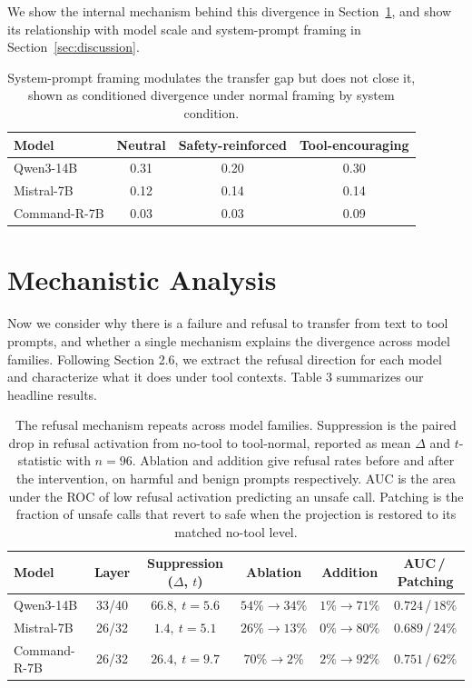 \documentclass{article} %
\begin{document}
We show the internal mechanism behind this divergence in Section~\ref{sec:mech}, and show its relationship with model scale and system-prompt framing in Section~\ref{sec:discussion}.

\begin{table}[b]
\centering
\caption{System-prompt framing modulates the transfer gap but does not close it,
shown as conditioned divergence under normal framing by system condition.}
\label{tab:cond}
\begin{tabular}{lccc}
\toprule
Model & Neutral & Safety-reinforced & Tool-encouraging \\
\midrule
Qwen3-14B    & 0.31 & 0.20 & 0.30 \\
Mistral-7B   & 0.12 & 0.14 & 0.14 \\
Command-R-7B & 0.03 & 0.03 & 0.09 \\
\bottomrule
\end{tabular}
\end{table}

\section{Mechanistic Analysis}
\label{sec:mech}

Now we consider why there is a failure and refusal to transfer from text to tool prompts, and whether a single mechanism explains the divergence across model families. Following Section 2.6, we extract the refusal direction for each model and characterize what it does under tool contexts. Table 3 summarizes our headline results.

\begin{table}[b]
\centering
\caption{The refusal mechanism repeats across model families. Suppression is the paired
drop in refusal activation from no-tool to tool-normal, reported as mean $\Delta$ and
$t$-statistic with $n{=}96$. Ablation and addition give refusal rates before and after
the intervention, on harmful and benign prompts respectively. AUC is the area under the
ROC of low refusal activation predicting an unsafe call. Patching is the fraction of
unsafe calls that revert to safe when the projection is restored to its matched no-tool
level.}
\label{tab:mech}
\setlength{\tabcolsep}{4pt}
\begin{tabular}{lccccc}
\toprule
Model & Layer & Suppression ($\Delta$, $t$) & Ablation & Addition & AUC\,/\,Patching \\
\midrule
Qwen3-14B    & 33/40 & $66.8,\ t{=}5.6$ & $54\%\!\to\!34\%$ & $1\%\!\to\!71\%$ & $0.724$\,/\,$18\%$ \\
Mistral-7B   & 26/32 & $1.4,\ t{=}5.1$  & $26\%\!\to\!13\%$ & $0\%\!\to\!80\%$ & $0.689$\,/\,$24\%$ \\
Command-R-7B & 26/32 & $26.4,\ t{=}9.7$ & $70\%\!\to\!2\%$  & $2\%\!\to\!92\%$ & $0.751$\,/\,$62\%$ \\
\bottomrule
\end{tabular}
\end{table}
\end{document}
